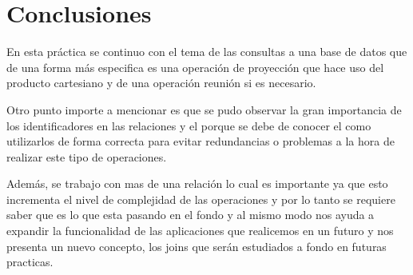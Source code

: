 \documentclass[12pt, titlepage]{article}
\begin{document}
\section{Conclusiones}
En esta práctica se continuo con el tema de las consultas a una base de datos que de una forma más especifica es una operación de proyección que hace uso del producto cartesiano y de una operación reunión si es necesario.

Otro punto importe a mencionar es que se pudo observar la gran importancia de los identificadores en las relaciones y el porque se debe de conocer el como utilizarlos de forma correcta para evitar redundancias o problemas a la hora de realizar este tipo de operaciones.

Además, se trabajo con mas de una relación lo cual es importante ya que esto incrementa el nivel de complejidad de las operaciones y por lo tanto se requiere saber que es lo que esta pasando en el fondo y al mismo modo nos ayuda a expandir la funcionalidad de las aplicaciones que realicemos en un futuro y nos presenta un nuevo concepto, los joins que serán estudiados a fondo en futuras practicas.
 

\end{document}
